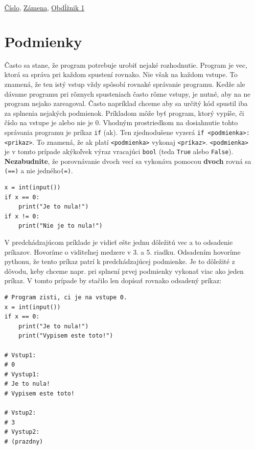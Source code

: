 \href{https://testovac.ksp.sk/tasks/ls-uvod-cislo/}{Číslo},
\href{https://testovac.ksp.sk/tasks/ls-uvod-zamena/}{Zámena},
\href{https://testovac.ksp.sk/tasks/ls-uvod-obdlznik1/}{Obdĺžnik 1}

\section{Podmienky}

Často sa stane, že program potrebuje urobiť nejaké rozhodnutie. Program je vec, ktorá sa správa pri každom spustení rovnako. Nie však na každom vstupe. To znamená, že ten istý vstup vždy spôsobí rovnaké správanie programu. Kedže ale dávame programu pri rôznych spusteniach často rôzne vstupy, je nutné, aby na ne program nejako zareagoval. Často napríklad chceme aby sa určitý kód spustil iba za splnenia nejakých podmienok. Príkladom môže byť program, ktorý vypíše, či číslo na vstupe je alebo nie je 0. Vhodným prostriedkom na dosiahnutie tohto správania programu je príkaz \texttt{if} (ak). Ten zjednodušene vyzerá \texttt{if <podmienka>: <prikaz>}. To znamená, že ak platí \texttt{<podmienka>}
vykonaj \texttt{<príkaz>}. \texttt{<podmienka>} je v tomto prípade akýkoľvek výraz vracajúci \texttt{bool} (teda \texttt{True} alebo \texttt{False}). \textbf{Nezabudnite}, že porovnávanie dvoch vecí sa vykonáva pomocou
\textbf{dvoch} rovná sa \texttt{(==)} a nie jedného\texttt{(=)}.

\begin{lstlisting}
x = int(input())
if x == 0:
    print("Je to nula!")
if x != 0:
    print("Nie je to nula!")
\end{lstlisting}

V predchádzajúcom príklade je vidieť ešte jednu dôležitú vec a to odsadenie príkazov. Hovoríme o viditeľnej medzere v 3. a 5. riadku. Odsadením hovoríme pythonu, že tento príkaz patrí k predchádzajúcej podmienke. Je to dôležité z dôvodu, keby chceme napr. pri splnení prvej podmienky vykonať viac ako jeden príkaz. V tomto prípade by stačilo len dopísať rovnako odsadený príkaz:

\begin{lstlisting}
# Program zisti, ci je na vstupe 0.
x = int(input())
if x == 0:
    print("Je to nula!")
    print("Vypisem este toto!")
    
# Vstup1:
# 0
# Vystup1:
# Je to nula!
# Vypisem este toto!

# Vstup2:
# 3
# Vystup2:
# (prazdny)
\end{lstlisting}

